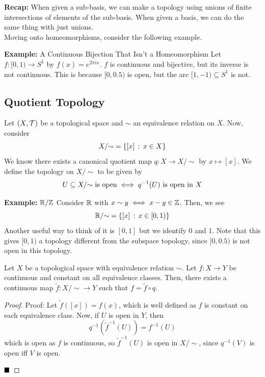 
\textbf{Recap:} When given a sub-basis, we can make a topology using unions of finite intersections of elements of the sub-basis. When given a basis, we can do the same thing with just unions.\\

Moving onto homeomorphisms, consider the following example.

\begin{example}{\textbf{Example:} A Continuous Bijection That Isn't a Homeomorphism}
    Let $f : [0, 1) \to S^1$ by $f(x) = e^{2\pi ix}$. $f$ is continuous and bijective, but its inverse is not continuous. This is because $[0, 0.5)$ is open, but the arc $[1, -1) \subseteq S^1$ is not.
\end{example}

\subsection*{Quotient Topology}
\sectionspace

Let $(X, \cal{T})$ be a topological space and $\sim$ an equivalence relation on $X$. Now, consider
\[ X/{\sim} = \{[x] \col x \in X\} \]
We know there exists a canonical quotient map $q : X \to X/{\sim}$ by $x \mapsto [x]$. We define the topology on $X/{\sim}$ to be given by
\[ U \subseteq X/{\sim} \tt{ is open} \iff q^{-1}(U) \tt{ is open in } X \]

\begin{example}{\textbf{Example:} $\R/\Z$}
    Consider $\R$ with $x \sim y \iff x - y \in \Z$. Then, we see
    \[ \R/{\sim} = \{[x] \col x \in [0, 1)\} \]
    Another useful way to think of it is $[0, 1]$ but we identify $0$ and $1$. Note that this gives $[0, 1)$ a topology different from the subspace topology, since $[0, 0.5)$ is not open in this topology.
\end{example}

\begin{lemma}
    Let $X$ be a topological space with equivalence relation $\sim$. Let $f : X \to Y$ be continuous and constant on all equivalence classes. Then, there exists a continuous map $\tilde{f} : X/{\sim} \to Y$ such that $f = \tilde{f} \circ q$.
    \begin{center}
    \end{center}
\end{lemma}
\begin{proof}{Proof:}
    Let $\tilde{f}([x]) = f(x)$, which is well defined as $f$ is constant on each equivalence class. Now, if $U$ is open in $Y$, then
    \[ q^{-1}(\tilde{f}^{-1}(U)) = f^{-1}(U) \]
    which is open as $f$ is continuous, so $\tilde{f}^{-1}(U)$ is open in $X/{\sim}$, since $q^{-1}(V)$ is open iff $V$ is open. 

    $\qed$
\end{proof}

